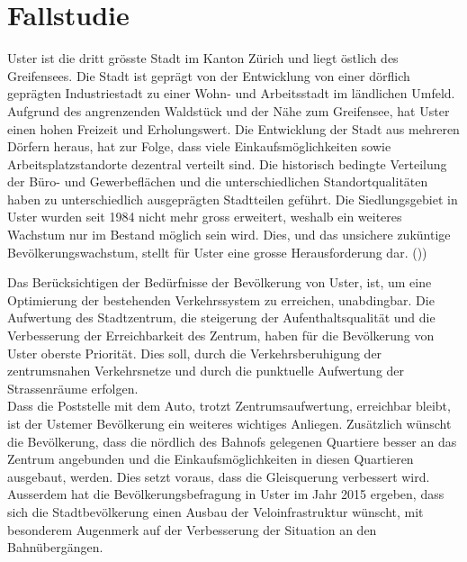 %
%
%
%

\chapter{Fallstudie}
\label{chap:Fallstudie}

Uster ist die dritt grösste Stadt im Kanton Zürich und liegt östlich des Greifensees. Die Stadt ist geprägt von der Entwicklung von einer dörflich geprägten Industriestadt zu einer Wohn- und Arbeitsstadt im ländlichen Umfeld. Aufgrund des angrenzenden Waldstück und der Nähe zum Greifensee, hat Uster einen hohen Freizeit und Erholungswert.
Die Entwicklung der Stadt aus mehreren Dörfern heraus, hat zur Folge, dass viele Einkaufsmöglichkeiten sowie Arbeitsplatzstandorte dezentral verteilt sind. Die historisch bedingte Verteilung der Büro- und Gewerbeflächen und die unterschiedlichen Standortqualitäten haben zu unterschiedlich ausgeprägten Stadtteilen geführt. Die Siedlungsgebiet in Uster wurden seit 1984 nicht mehr gross erweitert, weshalb ein weiteres Wachstum nur im Bestand möglich sein wird. Dies, und das unsichere zuküntige Bevölkerungswachstum, stellt für Uster eine grosse Herausforderung dar. (\cite{STEK}))

Das Berücksichtigen der Bedürfnisse der Bevölkerung von Uster, ist, um eine Optimierung der bestehenden Verkehrssystem zu erreichen, unabdingbar. Die Aufwertung des Stadtzentrum, die steigerung der Aufenthaltsqualität und die Verbesserung der Erreichbarkeit des Zentrum, haben für die Bevölkerung von Uster oberste Priorität. Dies soll, durch die Verkehrsberuhigung der zentrumsnahen Verkehrsnetze und durch die punktuelle Aufwertung der Strassenräume erfolgen. \\
Dass die Poststelle mit dem Auto, trotzt Zentrumsaufwertung, erreichbar bleibt, ist der Ustemer Bevölkerung ein weiteres wichtiges Anliegen. Zusätzlich wünscht die Bevölkerung, dass die nördlich des Bahnofs gelegenen Quartiere besser an das Zentrum angebunden und die Einkaufsmöglichkeiten in diesen Quartieren ausgebaut, werden. Dies setzt voraus, dass die Gleisquerung verbessert wird. Ausserdem hat die Bevölkerungsbefragung in Uster im Jahr 2015 ergeben, dass sich die Stadtbevölkerung einen Ausbau der Veloinfrastruktur wünscht, mit besonderem Augenmerk auf der Verbesserung der Situation an den Bahnübergängen. 

